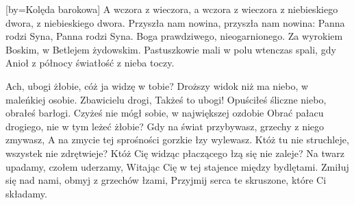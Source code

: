 
 [by={Kolęda barokowa}]
\beginverse
A wczora z wieczora, a wczora z wieczora
z niebieskiego dwora, z niebieskiego dwora.
Przyszła nam nowina, przyszła nam nowina:
Panna rodzi Syna, Panna rodzi Syna.
\endverse
\beginverse
Boga prawdziwego,
nieogarnionego.
Za wyrokiem Boskim,
w Betlejem żydowskim.
\endverse
\beginverse
Pastuszkowie mali
w polu wtenczas spali,
gdy Anioł z północy
światłość z nieba toczy.
\endverse
\endsong



\beginverse
Ach, ubogi żłobie, cóż ja widzę w tobie?
Droższy widok niż ma niebo, w maleńkiej osobie. 
\endverse
\beginverse
Zbawicielu drogi, Takżeś to ubogi!
Opuściłeś śliczne niebo, obrałeś barłogi.
\endverse
\beginverse
Czyżeś nie mógł sobie, w największej ozdobie
Obrać pałacu drogiego, nie w tym leżeć żłobie?
\endverse
\beginverse
Gdy na świat przybywasz, grzechy z niego zmywasz,
A na zmycie tej sprośności gorzkie łzy wylewasz.
\endverse
\beginverse
Któż tu nie struchleje, wszystek nie zdrętwieje?
Któż Cię widząc płaczącego łzą się nie zaleje?
\endverse
\beginverse
Na twarz upadamy, czołem uderzamy,
Witając Cię w tej stajence między bydlętami.
\endverse
\beginverse
Zmiłuj się nad nami, obmyj z grzechów łzami,
Przyjmij serca te skruszone, które Ci składamy.
\endverse
\endsong


